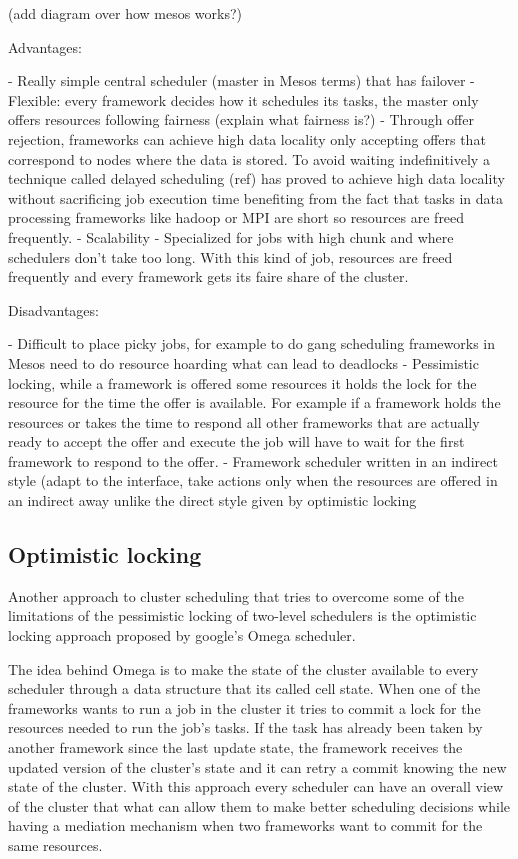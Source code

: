 \documentclass{svjour3}                     %
\begin{document}
(add diagram over how mesos works?)

Advantages:

- Really simple central scheduler (master in Mesos terms) that has
  failover 
- Flexible: every framework decides how it schedules its tasks, the
master only offers resources following fairness (explain what fairness is?)
- Through offer rejection, frameworks can achieve high data locality
only accepting offers that correspond to nodes where the data is
stored. To avoid waiting indefinitively a technique called delayed
scheduling (ref) has proved to achieve high data locality without
sacrificing job execution time benefiting from the fact that tasks in
data processing frameworks like hadoop or MPI are short so resources
are freed frequently.
- Scalability
- Specialized for jobs with high chunk and where schedulers don't take
too long. With this kind of job, resources are freed frequently and
every framework gets its faire share of the cluster.

Disadvantages:

- Difficult to place picky jobs, for example to do gang scheduling
frameworks in Mesos need to do resource hoarding what can lead to
deadlocks
- Pessimistic locking, while a framework is offered some resources it
holds the lock for the resource for the time the offer is
available. For example if a framework holds the resources or takes the
time to respond all other frameworks that are actually ready to accept
the offer and execute the job will have to wait for the first
framework to respond to the offer.
- Framework scheduler written in an indirect style (adapt to the interface, 
  take actions only when the resources are offered in an indirect away unlike
  the direct style given by optimistic locking

\subsection{Optimistic locking}

Another approach to cluster scheduling that tries to overcome some of
the limitations of the pessimistic locking of two-level schedulers is
the optimistic locking approach proposed by google's Omega
scheduler.

The idea behind Omega is to make the state of the cluster
available to every scheduler through a data structure that its called
cell state. When one of the frameworks wants to run a job in the
cluster it tries to commit a lock for the resources needed to run the
job's tasks. If the task has already been taken by another framework
since the last update state, the framework receives the updated
version of the cluster's state and it can retry a commit knowing the
new state of the cluster. With this approach every scheduler can have
an overall view of the cluster that what can allow them to make better
scheduling decisions while having a mediation mechanism when two
frameworks want to commit for the same resources.
\end{document}
